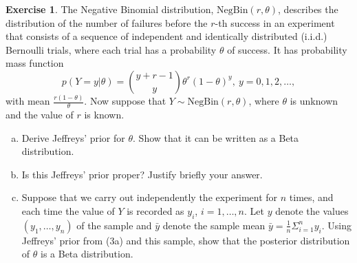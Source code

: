\documentclass{article}
\theoremstyle{plain}
\theoremstyle{definition}
\newtheorem{exercise}{Exercise}
\begin{document}
\begin{exercise}

The Negative Binomial distribution, $\mathrm{NegBin}(r, θ)$, describes the distribution of the number of failures before the $r$-th success in an experiment that consists of a sequence of independent and identically distributed (i.i.d.) Bernoulli trials, where each trial has a probability $θ$ of success. It has probability mass function
\[p(Y = y | θ) =\binom{y + r - 1}{y}θ^r(1 - θ)^y ,\ y = 0, 1, 2, \dots ,\]
with mean $\frac{r(1-θ)}{θ}$. Now suppose that $Y \sim \mathrm{NegBin}(r, θ)$, where $θ$ is unknown and the value of $r$ is known.
\begin{enumerate}[(a)]
\item Derive Jeffreys’ prior for $θ$. Show that it can be written as a Beta
distribution.
\item Is this Jeffreys’ prior proper? Justify briefly your answer.
\item Suppose that we carry out independently the experiment for $n$
times, and each time the value of $Y$ is recorded as $y_i$, $i = 1, \dots , n$. Let $y$ denote the values $(y_1, \dots , y_n)$ of the sample and $\bar{y}$ denote the sample mean $\bar{y} = \frac{1}{n}Σ^n_{i=1} y_i$. Using Jeffreys’ prior from (3a) and this sample, show that the posterior distribution of $θ$ is a Beta distribution. 
\end{enumerate}
\end{exercise}
\end{document}
